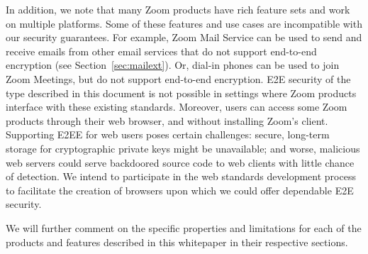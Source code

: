 In addition, we note that many Zoom products have rich feature sets and work on multiple platforms.
Some of these features and use cases are incompatible with our security guarantees. For example,
Zoom Mail Service can be used to send and receive emails from other email services that do not
support end-to-end encryption (see Section~\ref{sec:mailext}). Or, dial-in phones can be used to
join Zoom Meetings, but do not support end-to-end encryption. E2E security of the type described in
this document is not possible in settings where Zoom products interface with these existing
standards. Moreover, users can access some Zoom products through their web browser, and without
installing Zoom's client. Supporting E2EE for web users poses certain challenges: secure, long-term
storage for cryptographic private keys might be unavailable; and worse, malicious web servers could
serve backdoored source code to web clients with little chance of detection. We intend to
participate in the web standards development process to facilitate the creation of browsers upon
which we could offer dependable E2E security.

We will further comment on the specific properties and limitations for each of the products and
features described in this whitepaper in their respective sections.
